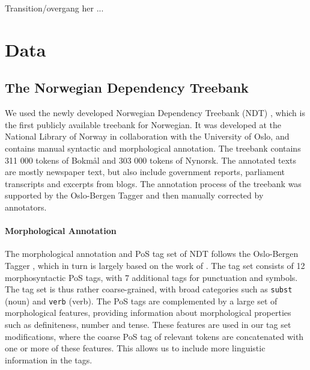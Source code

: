 \documentclass[11pt,a4paper]{article}
\begin{document}
Transition/overgang her ...

\section{Data}
\label{sec:data}
\subsection{The Norwegian Dependency Treebank}
We used the newly developed Norwegian Dependency Treebank (NDT)
\cite{Sol:Skj:Ovr:14}, which is the first publicly available treebank for
Norwegian. It was developed at the National Library of Norway in collaboration
with the University of Oslo, and contains manual syntactic and morphological
annotation. The treebank contains 311 000 tokens of Bokmål and 303 000 tokens
of Nynorsk.  The annotated texts are mostly newspaper text, but also include
government reports, parliament transcripts and excerpts from blogs. The
annotation process of the treebank was supported by the Oslo-Bergen Tagger
\cite{Hag:Joh:Nok:00} and then manually corrected by annotators.


\paragraph{Morphological Annotation}
The morphological annotation and PoS tag set of NDT follows the Oslo-Bergen
Tagger \cite{Hag:Joh:Nok:00,Sol:13}, which in turn is largely based on the work
of . The tag set consists of 12 morphosyntactic PoS
tags, with 7 additional tags for punctuation and symbols.  The tag set is thus
rather coarse-grained, with broad categories such as \texttt{subst} (noun) and
\texttt{verb} (verb). The PoS tags are complemented by a large set of
morphological features, providing information about morphological properties such as
definiteness, number and tense. These features are used in our tag set
modifications, where the coarse PoS tag of relevant tokens are concatenated
with one or more of these features.  This allows us to include more linguistic
information in the tags.
\end{document}
